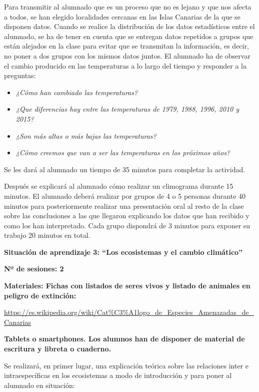 \documentclass[
]{article}
\providecommand{\tightlist}{%
  \setlength{\itemsep}{0pt}\setlength{\parskip}{0pt}}
\begin{document}
Para transmitir al alumnado que es un proceso que no es lejano y que nos
afecta a todos, se han elegido localidades cercanas en las Islas
Canarias de la que se disponen datos. Cuando se realice la distribución
de los datos estadísticos entre el alumnado, se ha de tener en cuenta
que se entregan datos repetidos a grupos que están alejados en la clase
para evitar que se transmitan la información, es decir, no poner a dos
grupos con los mismos datos juntos. El alumnado ha de observar el cambio
producido en las temperaturas a lo largo del tiempo y responder a la
preguntas:

\begin{itemize}
\tightlist
\item
  \emph{¿Cómo han cambiado las temperaturas?}
\item
  \emph{¿Que diferencias hay entre las temperaturas de 1979, 1988, 1996,
  2010 y 2015?}
\item
  \emph{¿Son más altas o más bajas las temperaturas?}
\item
  \emph{¿Cómo creemos que van a ser las temperaturas en los próximos
  años?}
\end{itemize}

Se les dará al alumnado un tiempo de 35 minutos para completar la
actividad.

Después se explicará al alumnado cómo realizar un climograma durante 15
minutos. El alumnado deberá realizar por grupos de 4 o 5 personas
durante 40 minutos para posteriormente realizar una presentación oral al
resto de la clase sobre las conclusiones a las que llegaron explicando
los datos que han recibido y como los han interpretado. Cada grupo
dispondrá de 3 minutos para exponer su trabajo 20 minutos en total.

\textbf{Situación de aprendizaje 3: ``Los ecosistemas y el cambio
climático''}

\textbf{Nº de sesiones: 2}

\textbf{Materiales: Fichas con listados de seres vivos y listado de
animales en peligro de extinción:}

\url{https://es.wikipedia.org/wiki/Cat\%C3\%A1logo_de_Especies_Amenazadas_de_Canarias}

\textbf{Tablets o smartphones. Los alumnos han de disponer de material
de escritura y libreta o cuaderno.}

Se realizará, en primer lugar, una explicación teórica sobre las
relaciones inter e intraespecíficas en los ecosistemas a modo de
introducción y para poner al alumnado en situación:
\end{document}
